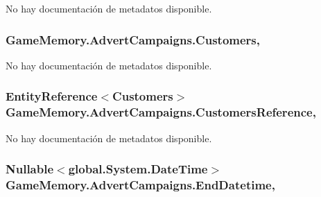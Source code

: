 No hay documentación de metadatos disponible. 

\hypertarget{class_game_memory_1_1_advert_campaigns_aa63acf86fef731a20b8d1b4b6842fa54}{
\subsubsection[{Customers}]{ Game\-Memory.\-Advert\-Campaigns.\-Customers\hspace{0.3cm}{\ttfamily [get]}, {\ttfamily [set]}}}\label{class_game_memory_1_1_advert_campaigns_aa63acf86fef731a20b8d1b4b6842fa54}


No hay documentación de metadatos disponible. 

\hypertarget{class_game_memory_1_1_advert_campaigns_a3a0f33054dc2f41e592a3504783abfa8}{
\subsubsection[{Customers\-Reference}]{\setlength{\rightskip}{0pt plus 5cm}Entity\-Reference$<${\bf Customers}$>$ Game\-Memory.\-Advert\-Campaigns.\-Customers\-Reference\hspace{0.3cm}{\ttfamily [get]}, {\ttfamily [set]}}}\label{class_game_memory_1_1_advert_campaigns_a3a0f33054dc2f41e592a3504783abfa8}


No hay documentación de metadatos disponible. 

\hypertarget{class_game_memory_1_1_advert_campaigns_a049a795b17f180045f49fabc2d826fe5}{
\subsubsection[{End\-Datetime}]{\setlength{\rightskip}{0pt plus 5cm}Nullable$<$global.\-System.\-Date\-Time$>$ Game\-Memory.\-Advert\-Campaigns.\-End\-Datetime\hspace{0.3cm}{\ttfamily [get]}, {\ttfamily [set]}}}\label{class_game_memory_1_1_advert_campaigns_a049a795b17f180045f49fabc2d826fe5}


